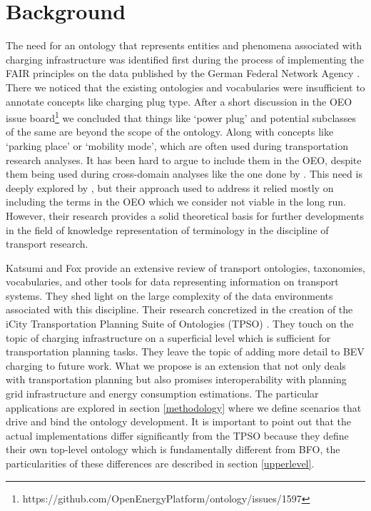 ﻿\section{Background}
\label{statementofneed}
The need for an ontology that represents entities and phenomena associated with
charging infrastructure was identified first during the process of implementing
the FAIR principles on the data published by the German Federal Network Agency
\cite{ArellanoRuiz.2024}. There we noticed that the existing ontologies and
vocabularies were insufficient to annotate concepts like charging plug type.
After a short discussion in the OEO issue
board\footnote{https://github.com/OpenEnergyPlatform/ontology/issues/1597} we
concluded that things like `power plug' and potential subclasses of
the same are beyond the scope of the ontology. Along with concepts like `parking
place' or `mobility mode', which are often used during transportation research
analyses. It has been hard to argue to include them in the OEO, despite them
being used during cross-domain analyses like the one done by \cite{Hecht.2022}.
This need is deeply explored by \cite{Mittermeier.2023}, but their approach
used to address it relied mostly on including the terms in the OEO which we
consider not viable in the long run. However, their research provides a solid
theoretical basis for further developments in the field of knowledge
representation of terminology in the discipline of transport research.

Katsumi and Fox \cite{Katsumi.2018} provide an extensive review of transport
ontologies, taxonomies, vocabularies, and other tools for data representing
information on transport systems. They shed light on the large complexity of
the data environments associated with this discipline. Their research concretized
in the creation of the iCity Transportation Planning Suite of Ontologies (TPSO)
\cite{Katsumi.2019}. They touch on the topic of charging infrastructure on a
superficial level which is sufficient for transportation planning tasks. They
leave the topic of adding more detail to BEV charging to future work. What we
propose is an extension that not only deals with transportation planning but
also promises interoperability with planning grid infrastructure and energy
consumption estimations. The particular applications are explored in section
\ref{methodology} where we define scenarios that drive and bind the ontology
development. It is important to point out that the actual implementations
differ significantly from the TPSO because they define their own top-level
ontology which is fundamentally different from BFO, the particularities of
these differences are described in section \ref{upperlevel}.

